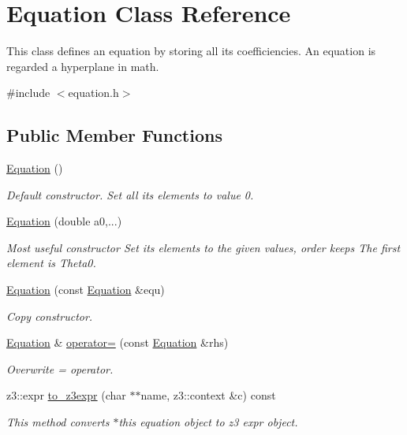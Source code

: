 \hypertarget{classEquation}{}\section{Equation Class Reference}
\label{classEquation}


This class defines an equation by storing all its coefficiencies. An equation is regarded a hyperplane in math.  




{\ttfamily \#include $<$equation.\+h$>$}

\subsection*{Public Member Functions}
\begin{DoxyCompactItemize}
\item 
\hyperlink{classEquation_a68511fc719250ed80f86c50de9136733}{Equation} ()
\begin{DoxyCompactList}\small\item\em Default constructor. Set all its elements to value 0. \end{DoxyCompactList}\item 
\hyperlink{classEquation_a2899879892ff76b229b4f11c0ec1de78}{Equation} (double a0,...)
\begin{DoxyCompactList}\small\item\em Most useful constructor Set its elements to the given values, order keeps The first element is Theta0. \end{DoxyCompactList}\item 
\hyperlink{classEquation_a81aaa52692da38c62bb684186912d91c}{Equation} (const \hyperlink{classEquation}{Equation} \&equ)
\begin{DoxyCompactList}\small\item\em Copy constructor. \end{DoxyCompactList}\item 
\hyperlink{classEquation}{Equation} \& \hyperlink{classEquation_a114154c932768fbe0e3587c10c44071d}{operator=} (const \hyperlink{classEquation}{Equation} \&rhs)
\begin{DoxyCompactList}\small\item\em Overwrite = operator. \end{DoxyCompactList}\item 
z3\+::expr \hyperlink{classEquation_a7d0317b67dd6ae784f5792363a242568}{to\+\_\+z3expr} (char $\ast$$\ast$name, z3\+::context \&c) const 
\begin{DoxyCompactList}\small\item\em This method converts $\ast$this equation object to z3 expr object. \end{DoxyCompactList}\item 
$$
\end{DoxyCompactItemize}
